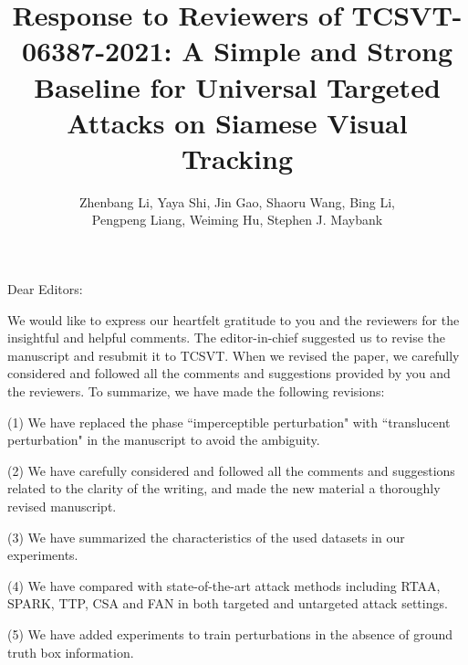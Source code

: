 \documentclass[12pt]{article}
\begin{document}
\linespread{1}
\title{Response to Reviewers of TCSVT-06387-2021: A Simple and Strong Baseline for Universal Targeted Attacks on Siamese Visual Tracking}
\author{Zhenbang Li, Yaya Shi, Jin Gao, Shaoru Wang, Bing Li,\\ Pengpeng Liang, Weiming Hu, Stephen J. Maybank}
\date{}
\maketitle

\noindent Dear Editors:

We would like to express our heartfelt gratitude to you and the reviewers for the insightful and helpful comments. 
The editor-in-chief suggested us to revise the manuscript and resubmit it to TCSVT.
When we revised the paper, we carefully considered and followed all the comments and suggestions provided by you and the reviewers. To summarize, we have made the following revisions:

(1) We have replaced the phase ``imperceptible perturbation" with ``translucent perturbation" in the manuscript to avoid the ambiguity.

(2) We have carefully considered and followed all the comments and suggestions related to the clarity of the writing, and made the new material a thoroughly revised manuscript.

(3) We have summarized the characteristics of the used datasets in our experiments.

(4) We have compared with state-of-the-art attack methods including RTAA, SPARK, TTP, CSA and FAN in both targeted and untargeted attack settings.

(5) We have added experiments to train perturbations in the absence of ground truth box information.
\end{document}
